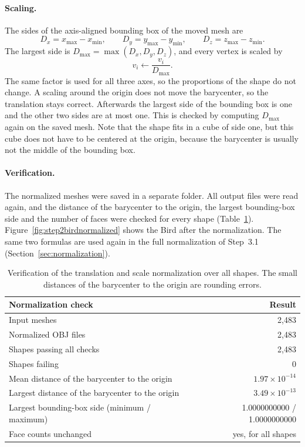 \documentclass[10pt,a4paper]{article}
\begin{document}
\paragraph{Scaling.} The sides of the axis-aligned bounding box of the moved mesh are
\begin{equation}
D_x=x_{\max}-x_{\min},\qquad
D_y=y_{\max}-y_{\min},\qquad
D_z=z_{\max}-z_{\min}.
\label{eq:step2extents}
\end{equation}
The largest side is $D_{\max}=\max(D_x,D_y,D_z)$, and every vertex is scaled by
\begin{equation}
v_i\leftarrow\frac{v_i}{D_{\max}}.
\label{eq:step2normalization}
\end{equation}
The same factor is used for all three axes, so the proportions of the shape do not change. A scaling around the origin does not
move the barycenter, so the translation stays correct. Afterwards the largest side of the bounding box is one and the other two
sides are at most one. This is checked by computing $D_{\max}$ again on the saved mesh. Note that the shape fits in a cube of
side one, but this cube does not have to be centered at the origin, because the barycenter is usually not the middle of the
bounding box.

\paragraph{Verification.} The normalized meshes were saved in a separate folder. All output files were read again, and the
distance of the barycenter to the origin, the largest bounding-box side and the number of faces were checked for every shape
(Table~\ref{tab:step2normalization}). Figure~\ref{fig:step2birdnormalized} shows the Bird after the normalization. The same two
formulas are used again in the full normalization of Step~3.1 (Section~\ref{sec:normalization}).

\begin{table}[htbp]\centering\small
\begin{tabular}{@{}lr@{}}\toprule
Normalization check & Result\\\midrule
Input meshes & 2,483\\
Normalized OBJ files & 2,483\\
Shapes passing all checks & 2,483\\
Shapes failing & 0\\
Mean distance of the barycenter to the origin & $1.97\times10^{-14}$\\
Largest distance of the barycenter to the origin & $3.49\times10^{-13}$\\
Largest bounding-box side (minimum / maximum) & 1.0000000000 / 1.0000000000\\
Face counts unchanged & yes, for all shapes\\
\bottomrule\end{tabular}
\caption{Verification of the translation and scale normalization over all shapes. The small distances of the barycenter to the
origin are rounding errors.}\label{tab:step2normalization}
\end{table}
\end{document}
